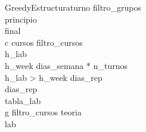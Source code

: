 \newpage
\begin{pseudocode}{GreedyEstructura}{turno}
\label{greedyestructura}
filtro\_grupos \GETS {}\\
principio \GETS {}\\
final \GETS {}\\
\FOREACH c \in cursos \DO
\BEGIN
    filtro\_cursos \GETS {}\\
    h\_lab \GETS {}\\
    h\_week \GETS dias\_semana * n\_turnos\\

    \IF h\_lab > h\_week \THEN
	    	dias\_rep \GETS {}\\
    \ELSE 
      dias\_rep \GETS \emptyset\\

   	tabla\_lab \GETS {}\\

   	\FOREACH g \in filtro\_cursos \DO
   	\BEGIN
   		teoria \GETS {}\\
   		lab \GETS {}\\


\end{pseudocode}
